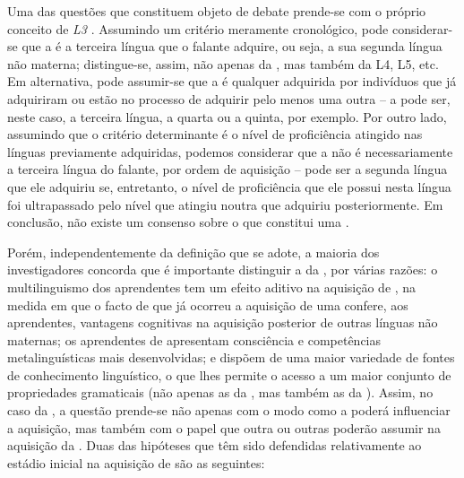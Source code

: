 \documentclass[output=paper]{LSP/langsci}
\begin{document}
Uma das questões que constituem objeto de debate prende-se com o próprio conceito de \textit{L3} \citep{rothman_etal2013}. Assumindo um critério meramente cronológico, pode considerar-se que a  é a terceira língua que o falante adquire, ou seja, a sua segunda língua não materna; distingue-se, assim, não apenas da , mas também da L4, L5, etc. Em alternativa, pode assumir-se que a  é qualquer  adquirida por indivíduos que já adquiriram ou estão no processo de adquirir pelo menos uma outra  – a  pode ser, neste caso, a terceira língua, a quarta ou a quinta, por exemplo. Por outro lado, assumindo que o critério determinante é o nível de proficiência atingido nas línguas previamente adquiridas, podemos considerar que a  não é necessariamente a terceira língua do falante, por ordem de aquisição – pode ser a segunda língua que ele adquiriu se, entretanto, o nível de proficiência que ele possui nesta língua foi ultrapassado pelo nível que atingiu noutra  que adquiriu posteriormente. Em conclusão, não existe um consenso sobre o que constitui uma . 

Porém, independentemente da definição que se adote, a maioria dos investigadores concorda que é importante distinguir a  da , por várias razões: o multilinguismo dos aprendentes tem um efeito aditivo na aquisição de  \citep{cenoz2003}, na medida em que o facto de que já ocorreu a aquisição de uma  confere, aos aprendentes, vantagens cognitivas na aquisição posterior de outras línguas não maternas; os aprendentes de  apresentam consciência e competências metalinguísticas mais desenvolvidas; e dispõem de uma maior variedade de fontes de conhecimento linguístico, o que lhes permite o acesso a um maior conjunto de propriedades gramaticais (não apenas as da , mas também as da ).
Assim, no caso da , a questão prende-se não apenas com o modo como a  poderá influenciar a aquisição, mas também com o papel que outra ou outras  poderão assumir na aquisição da . Duas das hipóteses que têm sido defendidas relativamente ao estádio inicial na aquisição de  são as seguintes:
\end{document}
